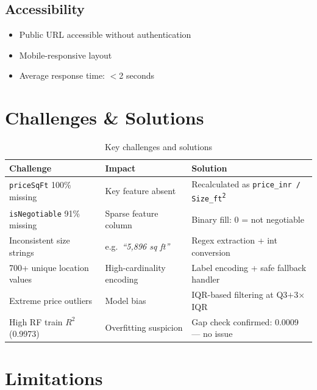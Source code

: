 \documentclass[12pt,a4paper]{article}
\newcommand{\TH}[1]{\cellcolor{TblHead}\color{white}\sffamily\bfseries\small #1}
\newcommand{\RA}{\cellcolor{RowA}}
\newcommand{\RB}{\cellcolor{RowB}}
\begin{document}
\subsection{Accessibility}
\begin{itemize}
  \item Public URL accessible without authentication
  \item Mobile-responsive layout
  \item Average response time: $<$2 seconds
\end{itemize}

\section{Challenges \& Solutions}

\begin{table}[H]\centering
  \caption{Key challenges and solutions}
  \begin{tabularx}{\textwidth}{X X X}
    \toprule
    \TH{Challenge} & \TH{Impact} & \TH{Solution} \\
    \midrule
    \RA\texttt{priceSqFt} 100\% missing & Key feature absent
      & Recalculated as \texttt{price\_inr / Size\_ft\textsuperscript{2}} \\
    \RB\texttt{isNegotiable} 91\% missing & Sparse feature column
      & Binary fill: 0 = not negotiable \\
    \RA Inconsistent size strings & e.g.\ \textit{``5,896 sq ft''}
      & Regex extraction + int conversion \\
    \RB 700+ unique location values & High-cardinality encoding
      & Label encoding + safe fallback handler \\
    \RA Extreme price outliers & Model bias
      & IQR-based filtering at Q3$+$3$\times$IQR \\
    \RB High RF train $R^{2}$ (0.9973) & Overfitting suspicion
      & Gap check confirmed: 0.0009 --- no issue \\
    \bottomrule
  \end{tabularx}
\end{table}

\section{Limitations}
\end{document}
